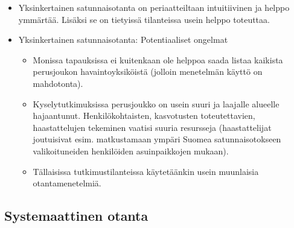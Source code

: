 \documentclass[
]{book}
\providecommand{\tightlist}{%
  \setlength{\itemsep}{0pt}\setlength{\parskip}{0pt}}
\begin{document}
\begin{itemize}
\item
  Yksinkertainen satunnaisotanta on periaatteiltaan intuitiivinen ja helppo ymmärtää. Lisäksi se on tietyissä tilanteissa usein helppo toteuttaa.
\item
  Yksinkertainen satunnaisotanta: Potentiaaliset ongelmat

  \begin{itemize}
  \tightlist
  \item
    Monissa tapauksissa ei kuitenkaan ole helppoa saada listaa kaikista perusjoukon havaintoyksiköistä (jolloin menetelmän käyttö on mahdotonta).
  \item
    Kyselytutkimuksissa perusjoukko on usein suuri ja laajalle alueelle hajaantunut. Henkilökohtaisten, kasvotusten toteutettavien, haastattelujen tekeminen vaatisi suuria resursseja (haastattelijat joutuisivat esim. matkustamaan ympäri Suomea satunnaisotokseen valikoituneiden henkilöiden asuinpaikkojen mukaan).
  \item
    Tällaisissa tutkimustilanteissa käytetäänkin usein muunlaisia otantamenetelmiä.
  \end{itemize}
\end{itemize}

\hypertarget{systemaattinen-otanta}{%
\subsection{Systemaattinen otanta}\label{systemaattinen-otanta}}
\end{document}
